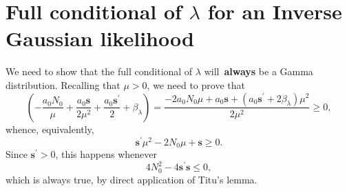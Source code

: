 \documentclass[a4paper, notitlepage, 11pt]{article}
\begin{document}
\section{Full conditional of $\lambda$ for an Inverse Gaussian likelihood}

We need to show that the full conditional of $\lambda$ will~\textbf{always} be a Gamma distribution.
Recalling that $\mu > 0$, we need to prove that 
\[ \left( -\frac{a_0N_0}{\mu} + \frac{a_0\boldsymbol s }{2\mu^2} + \frac{a_0\boldsymbol s^\prime}{2} + \beta_\lambda \right) = \frac{-2a_0N_0\mu + a_0\boldsymbol s + (a_0 \boldsymbol s^\prime + 2\beta_\lambda)\mu^2 }{2\mu^2} \geq 0,\]
whence, equivalently,
\[ \boldsymbol s^\prime\mu^2 -2N_0\mu + \boldsymbol s \geq 0. \]
Since $\boldsymbol s^\prime > 0$, this happens whenever
\[ 4N_0^2 - 4\boldsymbol s^\prime\boldsymbol s \leq 0, \]
which is always true, by direct application of Titu's lemma.
\end{document}
